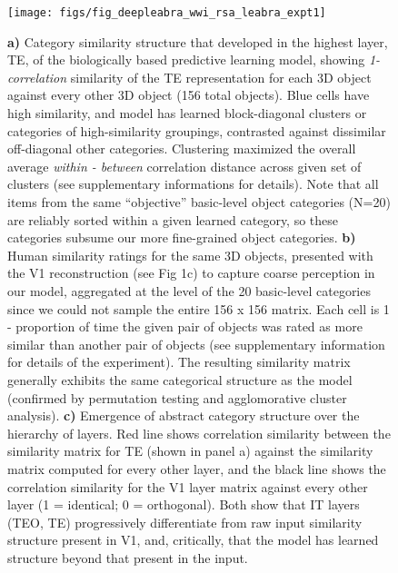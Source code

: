 \documentclass[12pt,twoside]{nature}
\newif\myifpdf
\begin{document}
\begin{figure}
  \centering\texttt{[image: figs/fig\_deepleabra\_wwi\_rsa\_leabra\_expt1]}
  \caption{\small {\bf a)} Category similarity structure that developed in the highest layer, TE, of the biologically based predictive learning model, showing {\em 1-correlation} similarity of the TE representation for each 3D object against every other 3D object (156 total objects). Blue cells have high similarity, and model has learned block-diagonal clusters or categories of high-similarity groupings, contrasted against dissimilar off-diagonal other categories.  Clustering maximized the overall average {\em within - between} correlation distance across given set of clusters (see supplementary informations for details).  Note that all items from the same ``objective'' basic-level object categories (N=20) are reliably sorted within a given learned category, so these categories subsume our more fine-grained object categories. {\bf b)} Human similarity ratings for the same 3D objects, presented with the V1 reconstruction (see Fig 1c) to capture coarse perception in our model, aggregated at the level of the 20 basic-level categories since we could not sample the entire 156 x 156 matrix. Each cell is 1 - proportion of time the given pair of objects was rated as more similar than another pair of objects (see supplementary information for details of the experiment).  The resulting similarity matrix generally exhibits the same categorical structure as the model (confirmed by permutation testing and agglomorative cluster analysis).  {\bf c)} Emergence of abstract category structure over the hierarchy of layers.  Red line shows correlation similarity between the similarity matrix for TE (shown in panel a) against the similarity matrix computed for every other layer, and the black line shows the correlation similarity for the V1 layer matrix against every other layer (1 = identical; 0 = orthogonal). Both show that IT layers (TEO, TE) progressively differentiate from raw input similarity structure present in V1, and, critically, that the model has learned structure beyond that present in the input.}
  \label{fig.rsa}
\end{figure}
\end{document}
